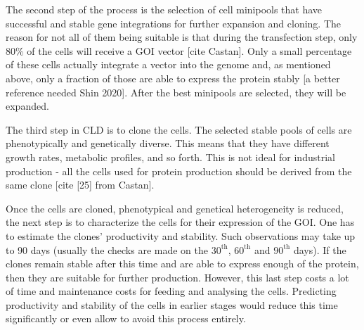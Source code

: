 The second step of the process is the selection of cell minipools that have successful and stable gene integrations for further expansion and cloning. The reason for not all of them being suitable is that during the transfection step, only 80\% of the cells will receive a GOI vector [cite Castan]. Only a small percentage of these cells actually integrate a vector into the genome and, as mentioned above, only a fraction of those are able to express the protein stably [a better reference needed Shin 2020]. After the best minipools are selected, they will be expanded.

The third step in CLD is to clone the cells. The selected stable pools of cells are phenotypically and genetically diverse. This means that they have different growth rates, metabolic profiles, and so forth. This is not ideal for industrial production - all the cells used for protein production should be derived from the same clone [cite [25] from Castan]. 

Once the cells are cloned, phenotypical and genetical heterogeneity is reduced, the next step is to characterize the cells for their expression of the GOI. One has to estimate the clones' productivity and stability. Such observations may take up to 90 days (usually the checks are made on the $30^{\text{th}}$, $60^{\text{th}}$ and $90^{\text{th}}$ days). If the clones remain stable after this time and are able to express enough of the protein, then they are suitable for further production. However, this last step costs a lot of time and maintenance costs for feeding and analysing the cells. Predicting productivity and stability of the cells in earlier stages would reduce this time significantly or even allow to avoid this process entirely. 